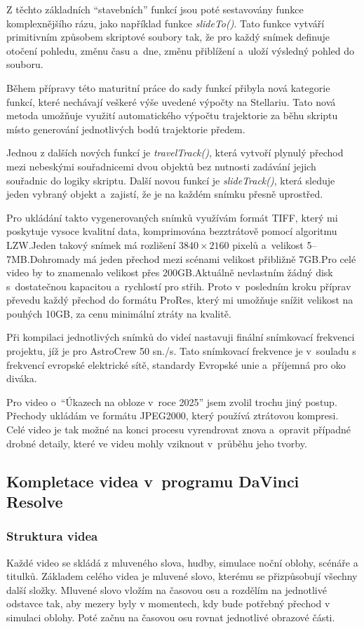 \documentclass[12pt,a4paper,titlepage]{article}
\begin{document}
Z těchto základních \enquote{stavebních} funkcí jsou poté sestavovány funkce komplexnějšího rázu, jako například funkce \textit{slideTo()}. Tato funkce vytváří primitivním způsobem skriptové soubory tak, že pro každý snímek definuje otočení pohledu, změnu času a~dne, změnu přiblížení a~uloží výsledný pohled do souboru. %

Během přípravy této maturitní práce do sady funkcí přibyla nová kategorie funkcí, které nechávají veškeré výše uvedené výpočty na Stellariu. Tato nová metoda umožňuje využití automatického výpočtu trajektorie za běhu skriptu místo generování jednotlivých bodů trajektorie předem. 

Jednou z dalších nových funkcí je \textit{travelTrack()}, která vytvoří plynulý přechod mezi nebeskými souřadnicemi dvou objektů bez nutnosti zadávání jejich souřadnic do logiky skriptu. Další novou funkcí je \textit{slideTrack()}, která sleduje jeden vybraný objekt a~zajistí, že je na každém snímku přesně uprostřed. %

Pro ukládání takto vygenerovaných snímků využívám formát TIFF, který mi poskytuje vysoce kvalitní data, komprimována bezztrátově pomocí algoritmu LZW.\@ Jeden takový snímek má rozlišení \(3840\times2160\) pixelů a~velikost 5--7MB.\@ Dohromady má jeden přechod mezi scénami velikost přibližně 7GB.\@ Pro celé video by to znamenalo velikost přes 200GB.\@ Aktuálně nevlastním žádný disk s~dostatečnou kapacitou a~rychlostí pro střih. Proto v~posledním kroku příprav převedu každý přechod do formátu ProRes, který mi umožňuje snížit velikost na pouhých 10GB, za cenu minimální ztráty na kvalitě. 

Při kompilaci jednotlivých snímků do videí nastavuji finální snímkovací frekvenci projektu, jíž je pro AstroCrew 50 sn./s. Tato snímkovací frekvence je v~souladu s frekvencí evropské elektrické sítě, standardy Evropské unie a~příjemná pro oko diváka.

Pro video o~\enquote{Úkazech na obloze v~roce 2025} jsem zvolil trochu jiný postup. Přechody ukládám ve formátu JPEG2000, který používá ztrátovou kompresi. Celé video je tak možné na konci procesu vyrendrovat znova a~opravit případné drobné detaily, které ve videu mohly vziknout v~průběhu jeho tvorby.
\subsection{Kompletace videa v~programu DaVinci Resolve}\label{makingof:resolve}
\subsubsection{Struktura videa}\label{makingof:resolve:structure}
Každé video se skládá z mluveného slova, hudby, simulace noční oblohy, scénáře a titulků. Základem celého videa je mluvené slovo, kterému se přizpůsobují všechny další složky. Mluvené slovo vložím na časovou osu a rozdělím na jednotlivé odstavce tak, aby mezery byly v momentech, kdy bude potřebný přechod v simulaci oblohy. Poté začnu na časovou osu rovnat jednotlivé obrazové části.
\end{document}
